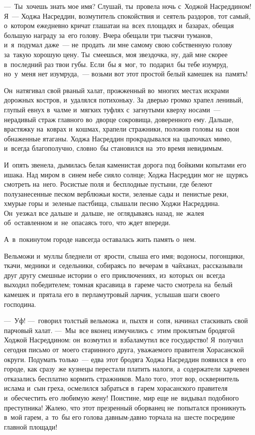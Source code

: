 \documentclass[12pt,a4paper]{book}
\begin{document}
—~Ты~хочешь знать мое имя? Слушай, ты~провела ночь с~Ходжой Насреддином! Я~— Ходжа Насреддин, возмутитель спокойствия и~сеятель раздоров, тот самый, о~котором ежедневно кричат глашатаи на~всех площадях и~базарах, обещая большую награду за~его голову. Вчера обещали три тысячи туманов, и~я~подумал даже~— не~продать~ли мне самому свою собственную голову за~такую хорошую цену. Ты~смеешься, моя звездочка, ну, дай мне скорее в~последний раз твои губы. Если~бы я~мог, то~подарил~бы тебе изумруд, но~у~меня нет изумруда,~— возьми вот этот простой белый камешек на~память!

Он~натягивал свой рваный халат, прожженный во~многих местах искрами дорожных костров, и~удалялся потихоньку. За~дверью громко храпел ленивый, глупый евнух в~чалме и~мягких туфлях с~загнутыми кверху носами~— нерадивый страж главного во~дворце сокровища, доверенного ему. Дальше, врастяжку на~коврах и~кошмах, храпели стражники, положив головы на~свои обнаженные ятаганы. Ходжа Насреддин прокрадывался на~цыпочках мимо, и~всегда благополучно, словно~бы становился на~это время невидимым.

И~опять звенела, дымилась белая каменистая дорога под бойкими копытами его ишака. Над миром в~синем небе сияло солнце; Ходжа Насреддин мог не~щурясь смотреть на~него. Росистые поля и~бесплодные пустыни, где белеют полузанесенные песком верблюжьи кости, зеленые сады и~пенистые реки, хмурые горы и~зеленые пастбища, слышали песню Ходжи Насреддина. Он~уезжал все дальше и~дальше, не~оглядываясь назад, не~жалея об~оставленном и~не~опасаясь того, что ждет впереди.

А~в~покинутом городе навсегда оставалась жить память о~нем.

Вельможи и~муллы бледнели от~ярости, слыша его имя; водоносы, погонщики, ткачи, медники и~седельники, собираясь по~вечерам в~чайханах, рассказывали друг другу смешные истории о~его приключениях, из~которых он~всегда выходил победителем; томная красавица в~гареме часто смотрела на~белый камешек и~прятала его в~перламутровый ларчик, услышав шаги своего господина.

—~Уф! —~говорил толстый вельможа~и, пыхтя и~сопя, начинал стаскивать свой парчовый халат. —~Мы~все вконец измучились с~этим проклятым бродягой Ходжой Насреддином: он~возмутил и~взбаламутил все государство! Я~получил сегодня письмо от~моего старинного друга, уважаемого правителя Хорасанской округи. Подумать только~— едва этот бродяга Ходжа Насреддин появился в~его городе, как сразу~же кузнецы перестали платить налоги, а~содержатели харчевен отказались бесплатно кормить стражников. Мало того, этот вор, осквернитель ислама и~сын греха, осмелился забраться в~гарем хорасанского правителя и~обесчестить его любимую жену! Поистине, мир еще не~видывал подобного преступника! Жалею, что этот презренный оборванец не~попытался проникнуть в~мой гарем, а~то~бы его голова давным-давно торчала на~шесте посредине главной площади!
\end{document}
